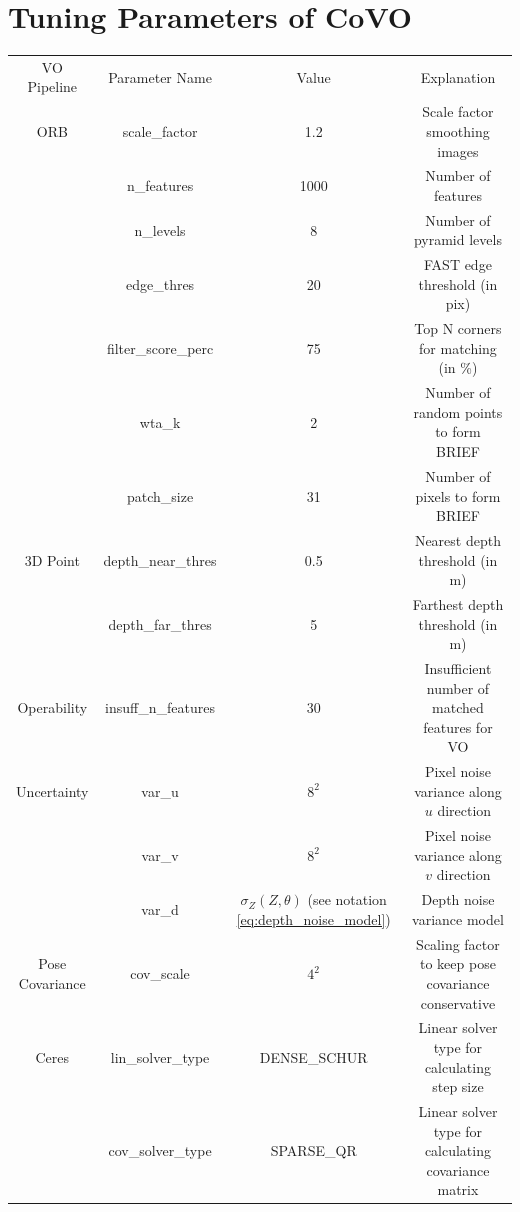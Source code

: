 \documentclass[a4paper]{report}
\numberwithin{figure}{section}
\begin{document}
\section{Tuning Parameters of CoVO}\label{sc_covo_tuning_param}

\begin{center}
  \begin{tabular}{|c|c|c|c|}
    VO Pipeline & Parameter Name & Value & Explanation\\
    ORB & scale\_factor & 1.2 & Scale factor smoothing images\\
    & n\_features & 1000 & Number of features \\
    & n\_levels & 8 & Number of pyramid levels\\
    & edge\_thres& 20 & FAST edge threshold (in pix)\\
    & filter\_score\_perc & 75 & Top N corners for matching (in \%)\\
    & wta\_k & 2 & Number of random points to form BRIEF\\
    & patch\_size & 31 & Number of pixels to form BRIEF\\
    3D Point & depth\_near\_thres & 0.5 & Nearest depth threshold (in m)\\
    & depth\_far\_thres & 5 & Farthest depth threshold (in m)\\
    Operability & insuff\_n\_features & 30 & Insufficient number of matched features for VO\\
    Uncertainty & var\_u & $8^2$ & Pixel noise variance along $u$ direction\\
    & var\_v & $8^2$ & Pixel noise variance along $v$ direction\\
    & var\_d & $\sigma_Z(Z,\theta)$ (see notation 
    \eqref{eq:depth_noise_model}) 
    & Depth noise variance model\\
    Pose Covariance & cov\_scale & $4^2$ & Scaling factor to keep pose covariance conservative\\
    Ceres & lin\_solver\_type & DENSE\_SCHUR & Linear solver type for calculating step size\\
    & cov\_solver\_type & SPARSE\_QR & Linear solver type for calculating covariance matrix\\
  \end{tabular}
\end{center}

\printbibliography[heading=bibintoc]
\end{document}

